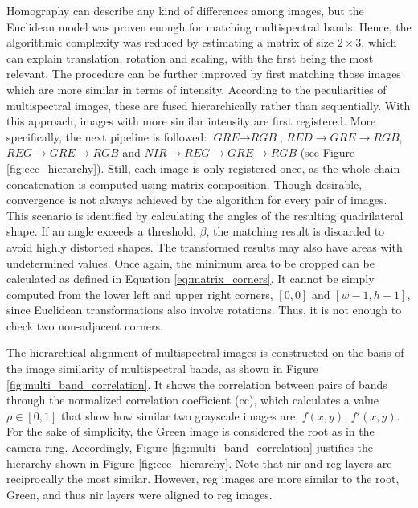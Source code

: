 Homography can describe any kind of differences among images, but the Euclidean model was proven enough for matching multispectral bands. Hence, the algorithmic complexity was reduced by estimating a matrix of size $2 \times 3$, which can explain translation, rotation and scaling, with the first being the most relevant. The procedure can be further improved by first matching those images which are more similar in terms of intensity. According to the peculiarities of multispectral images, these are fused hierarchically rather than sequentially. With this approach, images with more similar intensity are first registered. More specifically, the next pipeline is followed: $\textit{GRE} \rightarrow \textit{RGB}$, $\textit{RED} \rightarrow \textit{GRE} \rightarrow \textit{RGB}$, $\textit{REG} \rightarrow \textit{GRE} \rightarrow \textit{RGB}$ and $\textit{NIR} \rightarrow \textit{REG} \rightarrow \textit{GRE} \rightarrow \textit{RGB}$ (see Figure \ref{fig:ecc_hierarchy}). Still, each image is only registered once, as the whole chain concatenation is computed using matrix composition. Though desirable, convergence is not always achieved by the algorithm for every pair of images. This scenario is identified by calculating the angles of the resulting quadrilateral shape. If an angle exceeds a threshold, $\beta$, the matching result is discarded to avoid highly distorted shapes. The transformed results may also have areas with undetermined values. Once again, the minimum area to be cropped can be calculated as defined in Equation \ref{eq:matrix_corners}. It cannot be simply computed from the lower left and upper right corners, $[0, 0]$ and $[w - 1, h - 1]$, since Euclidean transformations also involve rotations. Thus, it is not enough to check two non-adjacent corners.

The hierarchical alignment of multispectral images is constructed on the basis of the image similarity of multispectral bands, as shown in Figure \ref{fig:multi_band_correlation}. It shows the correlation between pairs of bands through the normalized correlation coefficient (\acrshort{cc}), which calculates a value $\rho \in [0,1]$ that show how similar two grayscale images are, $f(x, y)$, $f'(x, y)$. For the sake of simplicity, the Green image is considered the root as in the camera ring. Accordingly, Figure \ref{fig:multi_band_correlation} justifies the hierarchy shown in Figure \ref{fig:ecc_hierarchy}. Note that \acrshort{nir} and \acrshort{reg} layers are reciprocally the most similar. However, \acrshort{reg} images are more similar to the root, Green, and thus \acrshort{nir} layers were aligned to \acrfull{reg} images.

